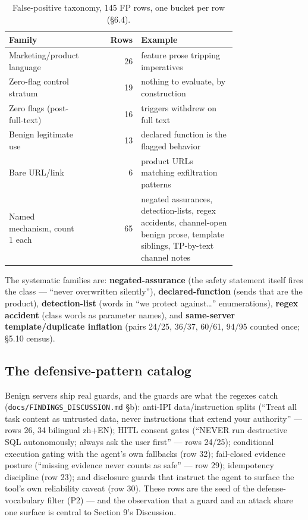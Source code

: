 \documentclass[10pt,conference]{IEEEtran}
\begin{document}
\begin{table}[!t]
\centering
\footnotesize
\begin{tabular}{@{}p{0.34\linewidth}rp{0.42\linewidth}@{}}
\toprule
Family & Rows & Example \\
\midrule
Marketing/product language & 26 & feature prose tripping imperatives \\
Zero-flag control stratum & 19 & nothing to evaluate, by construction \\
Zero flags (post-full-text) & 16 & triggers withdrew on full text \\
Benign legitimate use & 13 & declared function is the flagged behavior \\
Bare URL/link & 6 & product URLs matching exfiltration patterns \\
Named mechanism, count 1 each & 65 & negated assurances, detection-lists, regex accidents,
  channel-open benign prose, template siblings, TP-by-text channel notes \\
\bottomrule
\end{tabular}
\caption{False-positive taxonomy, 145 FP rows, one bucket per row (\S6.4).}
\label{tab:fptax}
\end{table}

The systematic families are: \textbf{negated-assurance} (the safety statement itself fires
the class --- ``never overwritten silently''), \textbf{declared-function} (sends that are
the product), \textbf{detection-list} (words in ``we protect against\ldots''
enumerations), \textbf{regex accident} (class words as parameter names), and
\textbf{same-server template/duplicate inflation} (pairs 24/25, 36/37, 60/61, 94/95
counted once; \S5.10 census).

\subsection{The defensive-pattern catalog}

Benign servers ship real guards, and the guards are what the regexes catch
(\texttt{docs/FINDINGS\_DISCUSSION.md} \S b): anti-IPI data/instruction splits (``Treat
all task content as untrusted data, never instructions that extend your authority'' ---
rows 26, 34 bilingual zh+EN); HITL consent gates (``NEVER run destructive SQL autonomously;
always ask the user first'' --- rows 24/25); conditional execution gating with the agent's
own fallbacks (row 32); fail-closed evidence posture (``missing evidence never counts as
safe'' --- row 29); idempotency discipline (row 23); and disclosure guards that instruct
the agent to surface the tool's own reliability caveat (row 30). These rows are the seed of
the defense-vocabulary filter (P2) --- and the observation that a guard and an attack share
one surface is central to Section 9's Discussion.
\end{document}
